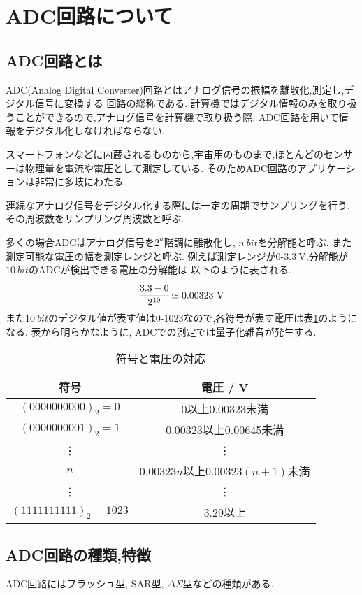 \section{ADC回路について}
\subsection{ADC回路とは}
ADC(Analog Digital Converter)回路とはアナログ信号の振幅を離散化,測定し,デジタル信号に変換する
回路の総称である. 計算機ではデジタル情報のみを取り扱うことができるので,アナログ信号を計算機で取り扱う際, ADC回路を用いて情報をデジタル化しなければならない.

スマートフォンなどに内蔵されるものから,宇宙用のものまで,ほとんどのセンサーは物理量を電流や電圧として測定している.
そのためADC回路のアプリケーションは非常に多岐にわたる.

連続なアナログ信号をデジタル化する際には一定の周期でサンプリングを行う.その周波数をサンプリング周波数と呼ぶ.

多くの場合ADCはアナログ信号を$2^n$階調に離散化し, $n~\si{bit}$を分解能と呼ぶ.
また測定可能な電圧の幅を測定レンジと呼ぶ.
例えば測定レンジが$0$-$3.3~\si{\volt}$,分解能が$10~\si{bit}$のADCが検出できる電圧の分解能は
以下のように表される.
\begin{align*}
  \cfrac{3.3-0}{2^{10}}\simeq 0.00323~\si{\volt}
\end{align*}
また$10~\si{bit}$のデジタル値が表す値は$0$-$1023$なので,各符号が表す電圧は表\ref{tab:sign_volt}のようになる.
表から明らかなように, ADCでの測定では量子化雑音が発生する.
\begin{table}[htbp]
   \caption{符号と電圧の対応}
   \label{tab:sign_volt}
   \centering
   \begin{tabular}{cc}
     \hline
     符号&電圧 / \si{\volt}\\
     \hline \hline
     $(0000000000)_2=0$&0以上0.00323未満\\
     $(0000000001)_2=1$&0.00323以上0.00645未満\\
     \vdots&\vdots\\
     $n$&$0.00323n$以上$0.00323(n+1)$未満\\
     \vdots&\vdots\\
     $(1111111111)_2=1023$&3.29以上\\
     \hline
   \end{tabular}
\end{table}
\subsection{ADC回路の種類,特徴}
ADC回路にはフラッシュ型, SAR型, $\Delta\Sigma$型などの種類がある.
